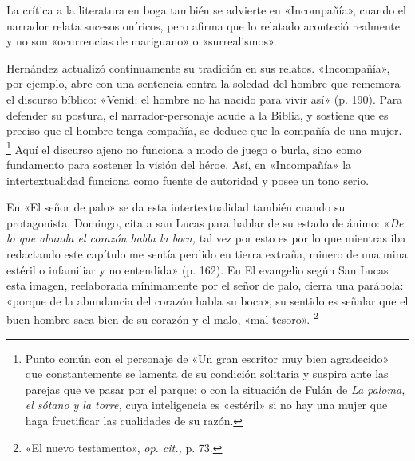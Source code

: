 \documentclass[14pt,twoside,final]{extbook} %
\let\oldfootnote\footnote
\renewcommand\footnote[1]{%
\oldfootnote{\hspace{1mm}#1}}
\begin{document}
La crítica a la literatura en boga también se advierte en «Incompañía», cuando el narrador relata sucesos oníricos, pero afirma que lo relatado aconteció realmente y no son «ocurrencias de mariguano» o «surrealismos».

Hernández actualizó continuamente su tradición en sus relatos. «Incompañía», por ejemplo, abre con una sentencia contra la soledad del hombre que rememora el discurso bíblico: «Venid; el hombre no ha nacido para vivir así» (p. 190). Para defender su postura, el narrador-personaje acude a la Biblia, y sostiene que es preciso que el hombre tenga compañía, se deduce que la compañía de una mujer.\footnote{Punto común con el personaje de «Un gran escritor muy bien agradecido» que constantemente se lamenta de su condición solitaria y suspira ante las parejas que ve pasar por el parque; o con la situación de Fulán de \emph{La paloma, el sótano y la torre,} cuya inteligencia es «estéril» si no hay una mujer que haga fructificar las cualidades de su razón.} Aquí el discurso ajeno no funciona a modo de juego o burla, sino como fundamento para sostener la visión del héroe. Así, en «Incompañía» la intertextualidad funciona como fuente de autoridad y posee un tono serio.

En «El señor de palo» se da esta intertextualidad también cuando su protagonista, Domingo, cita a san Lucas para hablar de su estado de ánimo: «\emph{De lo que abunda el corazón habla la boca,} tal vez por esto es por lo que mientras iba redactando este capítulo me sentía perdido en tierra extraña, minero de una mina estéril o infamiliar y no entendida» (p. 162). En El evangelio según San Lucas esta imagen, reelaborada mínimamente por el señor de palo, cierra una parábola: «porque de la abundancia del corazón habla su boca», su sentido es señalar que el buen hombre saca bien de su corazón y el malo, «mal tesoro».\footnote{«El nuevo testamento», \emph{op. cit.,} p. 73.}
\end{document}
